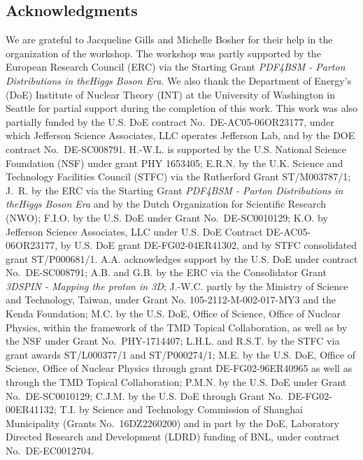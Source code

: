 \subsection*{Acknowledgments}

We are grateful to Jacqueline Gills and Michelle Bosher for their help in the
organization of the workshop.
%
The workshop was partly supported by the European Research Council (ERC) via 
the Starting Grant {\it PDF4BSM - Parton Distributions in theHiggs Boson Era}.
%
We also thank the Department of Energy's (DoE) Institute of Nuclear Theory 
(INT) at the University of Washington in Seattle for partial support during 
the completion of this work.
%
This work was also partially funded by the U.S. DoE contract 
No.~DE-AC05-06OR23177, under which Jefferson Science Associates, 
LLC operates Jefferson Lab, and by the DOE contract No.~DE-SC008791. 
% 
H.-W.L. is supported by the U.S. National Science Foundation (NSF) under grant 
PHY 1653405; E.R.N. by the U.K. Science and Technology Facilities Council 
(STFC) via the Rutherford Grant ST/M003787/1; J.~R. by the ERC via the Starting 
Grant {\it PDF4BSM - Parton Distributions in theHiggs Boson Era} and by the 
Dutch Organization for Scientific Research (NWO); F.I.O. by the U.S. DoE under 
Grant No.~DE-SC0010129; K.O. by Jefferson Science Associates, LLC under U.S. 
DoE Contract DE-AC05-06OR23177, by U.S. DoE grant DE-FG02-04ER41302, 
and  by STFC consolidated grant ST/P000681/1.
%
A.A. acknowledges support by the U.S. DoE under contract No.~DE-SC008791;
A.B. and G.B. by the ERC via the Consolidator Grant {\it 3DSPIN - Mapping the
proton in 3D};
J.-W.C. partly by the Ministry of Science and Technology, Taiwan,
under Grant No. 105-2112-M-002-017-MY3 and the Kenda Foundation;
M.C. by the U.S. DoE, Office of Science, Office of Nuclear Physics, within the 
framework of the TMD Topical Collaboration, as well as by the NSF under Grant 
No.~PHY-1714407;
L.H.L. and R.S.T. by the STFC via grant awards ST/L000377/1 and ST/P000274/1;
M.E. by the U.S. DoE, Office of Science, Office of Nuclear Physics through 
grant DE-FG02-96ER40965 as well as through the TMD Topical Collaboration;
P.M.N. by the U.S. DoE under Grant No.~DE-SC0010129; 
C.J.M. by the U.S. DoE through Grant No.~DE-FG02-00ER41132;
T.I. by Science and Technology Commission of Shanghai Municipality 
(Grants No.~16DZ2260200) and in part by the DoE, Laboratory Directed Research 
and Development (LDRD) funding of BNL, under contract No.~DE-EC0012704.



